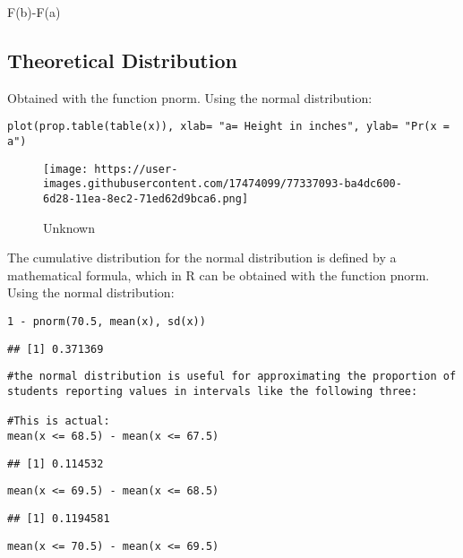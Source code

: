 \documentclass[
]{article}
\begin{document}
F(b)-F(a)

\hypertarget{theoretical-distribution}{%
\subsection{Theoretical Distribution}\label{theoretical-distribution}}

Obtained with the function pnorm. Using the normal distribution:

\begin{verbatim}
plot(prop.table(table(x)), xlab= "a= Height in inches", ylab= "Pr(x = a")
\end{verbatim}

\begin{figure}
\centering
\texttt{[image: https://user-images.githubusercontent.com/17474099/77337093-ba4dc600-6d28-11ea-8ec2-71ed62d9bca6.png]}
\caption{Unknown}
\end{figure}

The cumulative distribution for the normal distribution is defined by a
mathematical formula, which in R can be obtained with the function
pnorm. Using the normal distribution:

\begin{verbatim}
1 - pnorm(70.5, mean(x), sd(x))
\end{verbatim}

\begin{verbatim}
## [1] 0.371369
\end{verbatim}

\begin{verbatim}
#the normal distribution is useful for approximating the proportion of students reporting values in intervals like the following three:

#This is actual:
mean(x <= 68.5) - mean(x <= 67.5)
\end{verbatim}

\begin{verbatim}
## [1] 0.114532
\end{verbatim}

\begin{verbatim}
mean(x <= 69.5) - mean(x <= 68.5)
\end{verbatim}

\begin{verbatim}
## [1] 0.1194581
\end{verbatim}

\begin{verbatim}
mean(x <= 70.5) - mean(x <= 69.5)
\end{verbatim}
\end{document}
